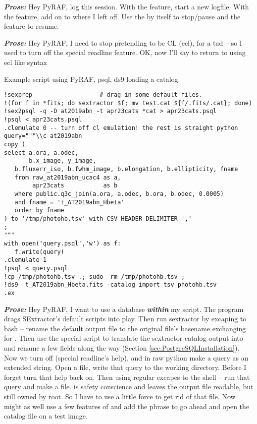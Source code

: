 \textbf{\emph{Prose:}} Hey PyRAF, log this session. With the
 feature, start a new logfile. With the 
feature, add on to where I left off. Use the 
  by itself to stop/pause and the
 feature to resume.

\textbf{\emph{Prose:}} Hey PyRAF, I need to stop pretending to be CL
(ecl), for a tad -- so I used  to turn off the
special readline feature. OK, now I'll say  to
return to using ecl like syntax

Example script using PyRAF, psql, ds9 loading a catalog.

\begingroup \fontsize{8pt}{8pt}
\selectfont
\begin{verbatim} 
!sexprep                   # drag in some default files.
!(for f in *fits; do sextractor $f; mv test.cat ${f/.fits/.cat}; done)
!sex2psql -q -D at2019abn -t apr23cats *cat > apr23cats.psql
!psql < apr23cats.psql
.clemulate 0 -- turn off cl emulation! the rest is straight python
query="""\\c at2019abn
copy (
select a.ora, a.odec, 
       b.x_image, y_image, 
   b.fluxerr_iso, b.fwhm_image, b.elongation, b.ellipticity, fname 
   from raw_at2019abn_ucac4 as a,
        apr23cats           as b
   where public.q3c_join(a.ora, a.odec, b.ora, b.odec, 0.0005)
   and fname = 't_AT2019abn_Hbeta'
   order by fname
) to '/tmp/photohb.tsv' with CSV HEADER DELIMITER ','
;
"""
with open('query.psql','w') as f:
   f.write(query)
.clemulate 1
!psql < query.psql
!cp /tmp/photohb.tsv .; sudo  rm /tmp/photohb.tsv ;
!ds9  t_AT2019abn_Hbeta.fits -catalog import tsv photohb.tsv
.ex

\end{verbatim}
\endgroup

\textbf{\emph{Prose:}}  Hey PyRAF, I
want to use a database  \textbf{\emph{within}} my
script. The program  drags SExtractor's default scripts
into play.  Then run sextractor by excaping to bash -- rename the
default output file  to the original file's basename
exchanging  for . Then use the special script
 to translate the sextractor catalog output into
\PostgreSQL and rename a few fields along the way (Section
\ref{sec:PostgreSQLInstallation}).  Now we turn off
   (special
readline's help), and in raw python make a query as an extended
string. Open a file, write that query to the working directory. Before
I forget turn that  help back on. Then using regular
excapes to the shell -- run that query and make a
 file. \PostgreSQL is safety conscience and
leaves the output file readable, but still owned by root. So I have to
use a little force to get rid of that file. Now might as well use a
few features of  and add the  phrase to go ahead and open the catalog file on a test
image.



